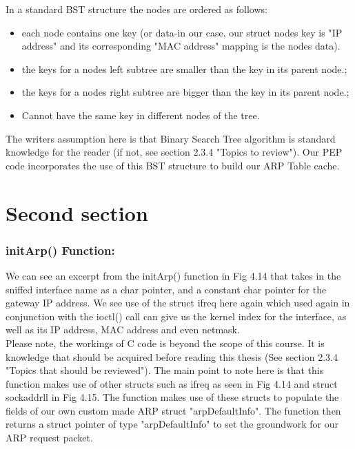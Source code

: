 \documentclass{uathesis}
\begin{document}
\begin{appendices}
In a standard BST structure the nodes are ordered as follows:

\begin{itemize}
\item each node contains one key (or data-in our case, our struct nodes key is "IP address" and its corresponding "MAC address" mapping is the nodes data).
\item the keys for a nodes left subtree are smaller than the key in its parent node.;
\item the keys for a nodes right subtree are bigger than the key in its parent node.;
\item Cannot have the same key in different nodes of the tree.\\
\end{itemize}

The writers assumption here is that Binary Search Tree algorithm is standard knowledge for the reader (if not, see section 2.3.4 "Topics to review"). Our PEP code incorporates the use of this BST structure to build our ARP Table cache. \\
  \section{Second section}
 \subsubsection*{initArp() Function:}

We can see an excerpt from the initArp() function in Fig  4.14 that takes in the sniffed interface name as a char pointer, and a constant char pointer for the gateway IP address. We see use of the struct ifreq here again which used again in conjunction with the ioctl() call can give us the kernel index for the interface, as well as its IP address, MAC address and even netmask. \\

Please note, the workings of C code is beyond the scope of this course. It is knowledge that should be acquired before reading this thesis (See section 2.3.4 "Topics that should be reviewed"). The main point to note here is that this function makes use of other structs such as ifreq as seen in Fig 4.14 and struct sockaddr\textunderscore ll in Fig 4.15. The function makes use of these structs to populate the fields of our own custom made ARP struct "arpDefaultInfo". The function then returns a struct pointer of type "arpDefaultInfo" to set the groundwork for our ARP request packet.\\



\end{appendices}
\end{document}
